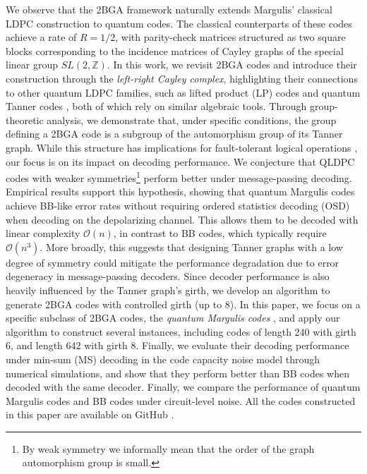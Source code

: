 \documentclass[a4paper,twocolumn,11pt,accepted=2026-05-03]{quantumarticle}
\begin{document}
We observe that the 2BGA framework naturally extends Margulis' classical LDPC construction \cite{margulis1982explicit} to quantum codes. The classical counterparts of these codes achieve a rate of ${R=1/2}$, with parity-check matrices structured as two square blocks corresponding to the incidence matrices of Cayley graphs of the special linear group $SL(2,\mathbb{Z})$. In this work, we revisit 2BGA codes and introduce their construction through the \textit{left-right Cayley complex}, highlighting their connections to other quantum LDPC families, such as lifted product (LP) codes \cite{panteleev_asymptotically_2022} and quantum Tanner codes \cite{leverrier_quantum_2022}, both of which rely on similar algebraic tools. Through group-theoretic analysis, we demonstrate that, under specific conditions, the group defining a 2BGA code is a subgroup of the automorphism group of its Tanner graph. While this structure has implications for fault-tolerant logical operations \cite{malcolm2025computingefficientlyqldpccodes}, our focus is on its impact on decoding performance. We conjecture that QLDPC codes with weaker symmetries\footnote{By weak symmetry we informally mean that the order of the graph automorphism group is small.} perform better under message-passing decoding. Empirical results support this hypothesis, showing that quantum Margulis codes achieve BB-like error rates without requiring ordered statistics decoding (OSD) when decoding on the depolarizing channel. This allows them to be decoded with linear complexity $\mathcal{O}(n)$, in contrast to BB codes, which typically require $\mathcal{O}(n^3)$. More broadly, this suggests that designing Tanner graphs with a low degree of symmetry could mitigate the performance degradation due to error degeneracy in message-passing decoders. Since decoder performance is also heavily influenced by the Tanner graph's girth, we develop an algorithm to generate 2BGA codes with controlled girth (up to 8). In this paper, we focus on a specific subclass of 2BGA codes, the \textit{quantum Margulis codes} \cite{quantum_margulis_allerton}, and apply our algorithm to construct several instances, including codes of length 240 with girth 6, and length 642 with girth 8. Finally, we evaluate their decoding performance under min-sum (MS) decoding in the code capacity noise model through numerical simulations, and show that they perform better than BB codes when decoded with the same decoder. Finally, we compare the performance of quantum Margulis codes and BB codes under circuit-level noise. All the codes constructed in this paper are available on GitHub \cite{git_repo}. 
\end{document}
